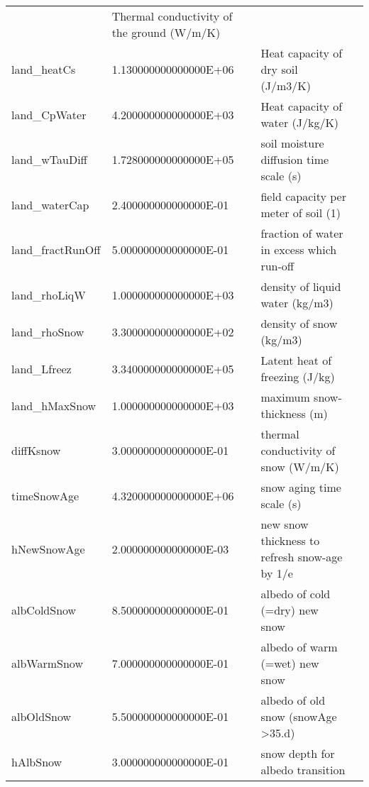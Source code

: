 \begin{table}
\begin{tabular}{lllc}
    &   Thermal conductivity of the ground (W/m/K)
    &  %
    \\
   land\_heatCs   &                   1.130000000000000E+06
    &   Heat capacity of dry soil (J/m3/K) 
    &  %
    \\
   land\_CpWater   &                   4.200000000000000E+03
    &   Heat capacity of water    (J/kg/K) 
    &  %
    \\
   land\_wTauDiff   &                   1.728000000000000E+05
    &   soil moisture diffusion time scale (s) 
    &  %
    \\
   land\_waterCap   &                   2.400000000000000E-01
    &   field capacity per meter of soil (1) 
    &  %
    \\
   land\_fractRunOff  &                   5.000000000000000E-01
    &   fraction of water in excess which run-off 
    &  %
    \\
   land\_rhoLiqW   &                   1.000000000000000E+03
    &   density of liquid water (kg/m3) 
    &  %
    \\
   land\_rhoSnow   &                   3.300000000000000E+02
    &   density of snow (kg/m3) 
    &  %
    \\
   land\_Lfreez   &                   3.340000000000000E+05
    &   Latent heat of freezing (J/kg) 
    &  %
    \\
   land\_hMaxSnow   &                   1.000000000000000E+03
    &   maximum snow-thickness (m) 
    &  %
    \\
   diffKsnow   &                   3.000000000000000E-01
    &   thermal conductivity of snow (W/m/K) 
    &  %
    \\
   timeSnowAge   &                   4.320000000000000E+06
    &   snow aging time scale   (s) 
    &  %
    \\
   hNewSnowAge   &                   2.000000000000000E-03
    &   new snow thickness to refresh snow-age by 1/e 
    &  %
    \\
   albColdSnow   &                   8.500000000000000E-01
    &   albedo of cold (=dry) new snow 
    &  %
    \\
   albWarmSnow   &                   7.000000000000000E-01
    &   albedo of warm (=wet) new snow 
    &  %
    \\
   albOldSnow   &                   5.500000000000000E-01
    &   albedo of old snow (snowAge >35.d)
    &  %
    \\
   hAlbSnow   &                   3.000000000000000E-01
    &   snow depth for albedo transition 
    &  %
    \\

\end{tabular}
\end{table}

